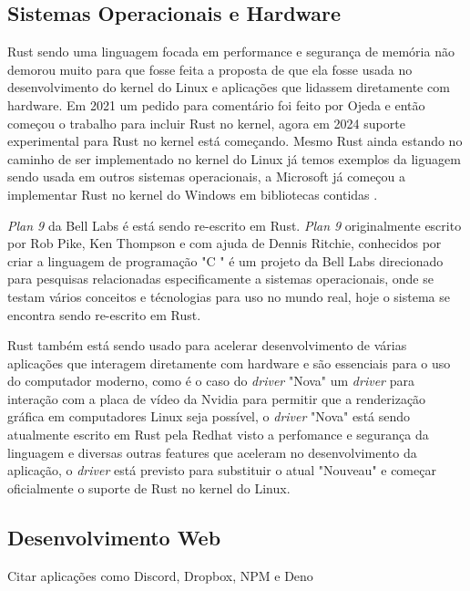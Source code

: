 \subsection{Sistemas Operacionais e Hardware}
Rust sendo uma linguagem focada em performance e seguran\c{c}a de mem\'{o}ria n\~{a}o demorou muito para que fosse feita a proposta de que ela fosse usada no desenvolvimento do kernel do Linux e aplica\c{c}\~{o}es que lidassem diretamente com hardware. Em 2021 um pedido para coment\'{a}rio foi feito por Ojeda e ent\~{a}o come\c{c}ou o trabalho para incluir Rust no kernel, agora em 2024 suporte experimental para Rust no kernel est\'{a} come\c{c}ando. Mesmo Rust ainda estando no caminho de ser implementado no kernel do Linux j\'{a} temos exemplos da liguagem sendo usada em outros sistemas operacionais, a Microsoft j\'{a} come\c{c}ou a implementar Rust no kernel do Windows em bibliotecas contidas \cite{Wes23}.
\par
\textit{Plan 9} da Bell Labs \cite{WikiPlan24} \'{e} est\'{a} sendo re-escrito em Rust. \textit{Plan 9} originalmente escrito por Rob Pike, Ken Thompson e com ajuda de Dennis Ritchie, conhecidos por criar a linguagem de programa\c{c}\~{a}o "C
" \'{e} um projeto da Bell Labs direcionado para pesquisas relacionadas especificamente a sistemas operacionais, onde se testam v\'{a}rios conceitos e t\'{e}cnologias para uso no mundo real, hoje o sistema se encontra sendo re-escrito em Rust.
\par
Rust tamb\'{e}m est\'{a} sendo usado para acelerar desenvolvimento de v\'{a}rias aplica\c{c}\~{o}es que interagem diretamente com hardware e s\~{a}o essenciais para o uso do computador moderno, como \'{e} o caso do \textit{driver} "Nova" \cite{Cas24}  um \textit{driver} para intera\c{c}\~{a}o com a placa de v\'{i}deo da Nvidia para permitir que a renderiza\c{c}\~{a}o gr\'{a}fica em computadores Linux seja poss\'{i}vel, o \textit{driver} "Nova" est\'{a} sendo atualmente escrito em Rust pela Redhat visto a perfomance e seguran\c{c}a da linguagem e diversas outras features que aceleram no desenvolvimento da aplica\c{c}\~{a}o, o \textit{driver} est\'{a} previsto para substituir o atual "Nouveau" e come\c{c}ar oficialmente o suporte de Rust no kernel do Linux.


\subsection{Desenvolvimento Web}
\par
Citar aplica\c{c}\~{o}es como Discord, Dropbox, NPM e Deno
